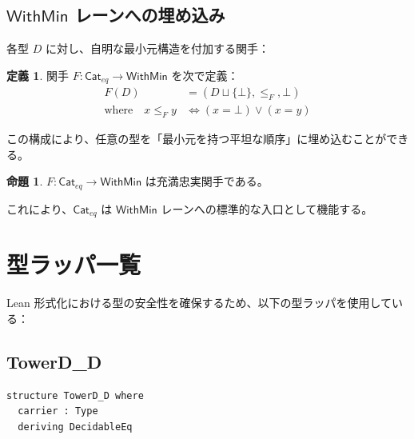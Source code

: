 \documentclass[a4paper,12pt]{ltjsarticle}
\theoremstyle{definition}
\newtheorem{definition}{定義}[section]
\newtheorem{proposition}{命題}[section]
\begin{document}
\subsection{$\mathsf{WithMin}$ レーンへの埋め込み}

各型 $D$ に対し、自明な最小元構造を付加する関手：

\begin{definition}
関手 $F : \mathsf{Cat}_{eq} \to \mathsf{WithMin}$ を次で定義：
\begin{align*}
  F(D) &= (D \sqcup \{\bot\}, \le_F, \bot) \\
  \text{where} \quad
  x \le_F y &\iff (x = \bot) \lor (x = y)
\end{align*}
\end{definition}

この構成により、任意の型を「最小元を持つ平坦な順序」に埋め込むことができる。

\begin{center}
\end{center}

\begin{proposition}
$F : \mathsf{Cat}_{eq} \to \mathsf{WithMin}$ は充満忠実関手である。
\end{proposition}

これにより、$\mathsf{Cat}_{eq}$ は $\mathsf{WithMin}$ レーンへの標準的な入口として機能する。


\newpage
\appendix

\section{型ラッパ一覧}

Lean 形式化における型の安全性を確保するため、以下の型ラッパを使用している：

\subsection{TowerD\_D}

\begin{verbatim}
structure TowerD_D where
  carrier : Type
  deriving DecidableEq
\end{verbatim}
\end{document}
